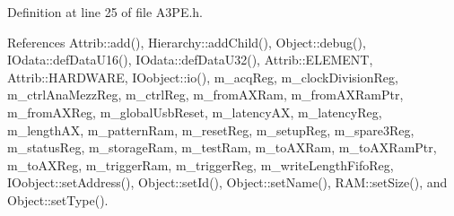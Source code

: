 Definition at line 25 of file A3\+P\+E.\+h.



References Attrib\+::add(), Hierarchy\+::add\+Child(), Object\+::debug(), I\+Odata\+::def\+Data\+U16(), I\+Odata\+::def\+Data\+U32(), Attrib\+::\+E\+L\+E\+M\+E\+NT, Attrib\+::\+H\+A\+R\+D\+W\+A\+RE, I\+Oobject\+::io(), m\+\_\+acq\+Reg, m\+\_\+clock\+Division\+Reg, m\+\_\+ctrl\+Ana\+Mezz\+Reg, m\+\_\+ctrl\+Reg, m\+\_\+from\+A\+X\+Ram, m\+\_\+from\+A\+X\+Ram\+Ptr, m\+\_\+from\+A\+X\+Reg, m\+\_\+global\+Usb\+Reset, m\+\_\+latency\+AX, m\+\_\+latency\+Reg, m\+\_\+length\+AX, m\+\_\+pattern\+Ram, m\+\_\+reset\+Reg, m\+\_\+setup\+Reg, m\+\_\+spare3\+Reg, m\+\_\+status\+Reg, m\+\_\+storage\+Ram, m\+\_\+test\+Ram, m\+\_\+to\+A\+X\+Ram, m\+\_\+to\+A\+X\+Ram\+Ptr, m\+\_\+to\+A\+X\+Reg, m\+\_\+trigger\+Ram, m\+\_\+trigger\+Reg, m\+\_\+write\+Length\+Fifo\+Reg, I\+Oobject\+::set\+Address(), Object\+::set\+Id(), Object\+::set\+Name(), R\+A\+M\+::set\+Size(), and Object\+::set\+Type().


